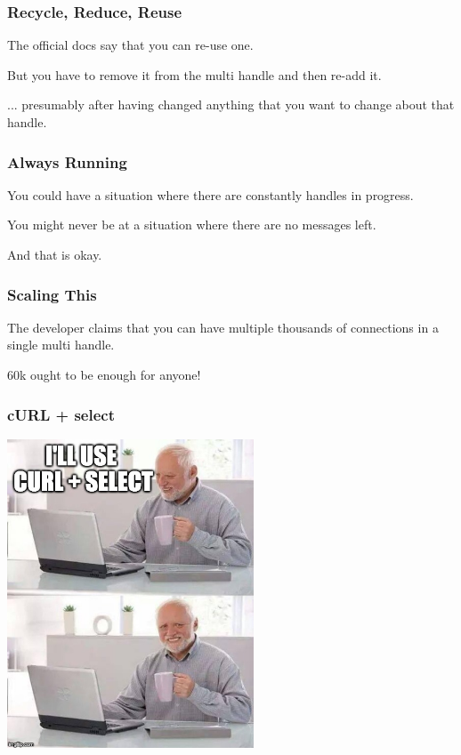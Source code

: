 \begin{frame}
	\frametitle{Recycle, Reduce, Reuse}

	The official docs say that you can re-use one.

	But you have to remove it from the multi handle and then re-add it.

	... presumably after having changed anything that you want to change about that handle.

\end{frame}


\begin{frame}
	\frametitle{Always Running}

	You could have a situation where there are constantly handles in progress.

	You might never be at a situation where there are no messages left.

	And that is okay.

\end{frame}

\begin{frame}
	\frametitle{Scaling This}

	The developer claims that you can have multiple thousands of connections in a single multi handle.

	60k ought to be enough for anyone!
\end{frame}


\begin{frame}
	\frametitle{cURL + select}
	\begin{center}
		\includegraphics[width=0.55\textwidth]{images/harold.jpg}
	\end{center}


\end{frame}


